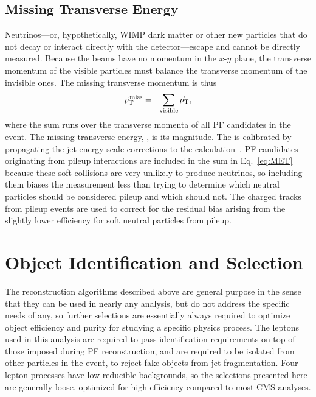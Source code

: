 \subsection{Missing Transverse Energy}

Neutrinos---or, hypothetically, WIMP dark matter or other new particles that do not decay or interact directly with the detector---escape and cannot be directly measured.
Because the beams have no momentum in the $x$-$y$ plane, the transverse momentum of the visible particles must balance the transverse momentum of the invisible ones.
The missing transverse momentum is thus
\begin{equation}\label{eq:MET}
  {\vec p}_{\mathrm{T}}^{\kern1pt\mathrm{miss}} = -\! \! \sum_\text{visible} {\vec p}_{\mathrm{T}},
\end{equation}
where the sum runs over the transverse momenta of all PF candidates in the event.
The missing transverse energy, {\MET}, is its magnitude.
The {\MET} is calibrated by propagating the jet energy scale corrections to the {\MET} calculation~\cite{Chatrchyan:2011tn,Khachatryan:2014gga,CMS-PAS-JME-16-004}.
PF candidates originating from pileup interactions are included in the sum in Eq.~\ref{eq:MET} because these soft collisions are very unlikely to produce neutrinos, so including them biases the measurement less than trying to determine which neutral particles should be considered pileup and which should not.
The charged tracks from pileup events are used to correct for the residual bias arising from the slightly lower efficiency for soft neutral particles from pileup.



\section{Object Identification and Selection}

The reconstruction algorithms described above are general purpose in the sense that they can be used in nearly any analysis, but do not address the specific needs of any, so further selections are essentially always required to optimize object efficiency and purity for studying a specific physics process.
The leptons used in this analysis are required to pass identification requirements on top of those imposed during PF reconstruction, and are required to be isolated from other particles in the event, to reject fake objects from jet fragmentation.
Four-lepton processes have low reducible backgrounds, so the selections presented here are generally loose, optimized for high efficiency compared to most CMS analyses.




